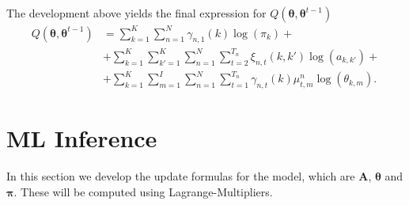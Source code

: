 \documentclass[12pt]{article}
\newcommand{\bs}{\boldsymbol}
\begin{document}
The development above yields the final expression for $Q \left( \boldsymbol { \theta } , \boldsymbol { \theta } ^ { t - 1 } \right)$
\begin{equation}
\begin{split}
Q \left( \boldsymbol { \theta } , \boldsymbol { \theta } ^ { t - 1 } \right) &= \sum\limits_{k=1}^{K}\sum _ { n = 1 } ^ { N } \gamma _ { n , 1 } ( k ) \log(\pi_{k}) + \\
&+ \sum\limits_{k=1}^{K}\sum\limits_{k'=1}^{K}\sum _ { n = 1 } ^ { N } \sum _ { t = 2 } ^ { T _ { n } } \xi _ { n , t } ( k , k' ) \log(a_{k,k'}) + \\
&+ \sum\limits_{k=1}^{K}\sum\limits_{m=1}^{I}\sum _ { n = 1 } ^ { N } \sum _ { t = 1 } ^ { T _ { n } } \gamma _ { n , t } ( k )\mu^{n}_{t,m} \log(\theta_{k,m}).
\end{split}
\end{equation}
\section{ML Inference}
In this section we develop the update formulas for the model, which are $\mathbf{A}$, $\bs\theta$ and $\bs\pi$. These will be computed using Lagrange-Multipliers.
\end{document}
